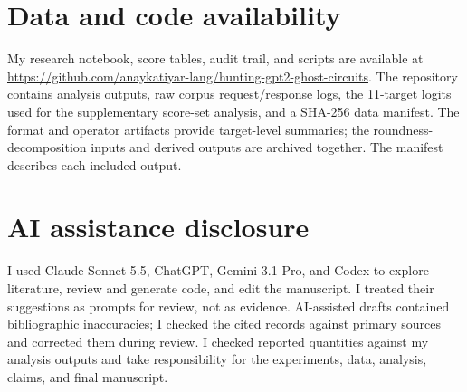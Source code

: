 \documentclass[11pt]{article}
\begin{document}
\section*{Data and code availability}

My research notebook, score tables, audit trail, and scripts are available at \url{https://github.com/anaykatiyar-lang/hunting-gpt2-ghost-circuits}. The repository contains analysis outputs, raw corpus request/response logs, the 11-target logits used for the supplementary score-set analysis, and a SHA-256 data manifest. The format and operator artifacts provide target-level summaries; the roundness-decomposition inputs and derived outputs are archived together. The manifest describes each included output.

\section*{AI assistance disclosure}

I used Claude Sonnet 5.5, ChatGPT, Gemini 3.1 Pro, and Codex to explore literature, review and generate code, and edit the manuscript. I treated their suggestions as prompts for review, not as evidence. AI-assisted drafts contained bibliographic inaccuracies; I checked the cited records against primary sources and corrected them during review. I checked reported quantities against my analysis outputs and take responsibility for the experiments, data, analysis, claims, and final manuscript.
\end{document}
